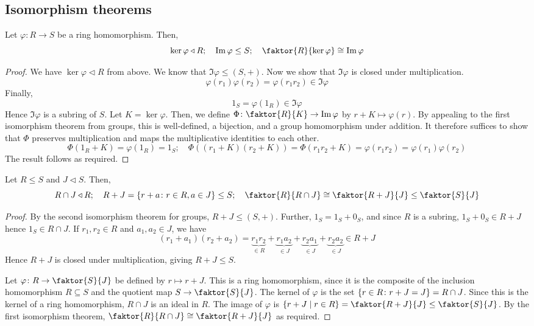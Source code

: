 \subsection{Isomorphism theorems}
\begin{theorem}
	Let \( \varphi \colon R \to S \) be a ring homomorphism.
	Then,
	\[
		\ker \varphi \triangleleft R;\quad \Im \varphi \leq S;\quad \faktor{R}{\ker \varphi} \cong \Im \varphi
	\]
\end{theorem}
\begin{proof}
	We have \( \ker \varphi \triangleleft R \) from above.
	We know that \( \Im \varphi \leq (S, +) \).
	Now we show that \( \Im \varphi \) is closed under multiplication.
	\[
		\varphi(r_1) \varphi(r_2) = \varphi(r_1 r_2) \in \Im \varphi
	\]
	Finally,
	\[
		1_S = \varphi(1_R) \in \Im \varphi
	\]
	Hence \( \Im \varphi \) is a subring of \( S \).
	Let \( K = \ker \varphi \).
	Then, we define \( \Phi \colon \faktor{R}{K} \to \Im \varphi \) by \( r+K \mapsto \varphi(r) \).
	By appealing to the first isomorphism theorem from groups, this is well-defined, a bijection, and a group homomorphism under addition.
	It therefore suffices to show that \( \Phi \) preserves multiplication and maps the multiplicative identities to each other.
	\[
		\Phi(1_R + K) = \varphi(1_R) = 1_S;\quad \Phi((r_1+K)(r_2+K)) = \Phi(r_1 r_2 +K) = \varphi(r_1 r_2) = \varphi(r_1) \varphi(r_2)
	\]
	The result follows as required.
\end{proof}
\begin{theorem}
	Let \( R \leq S \) and \( J \triangleleft S \).
	Then,
	\[
		R \cap J \triangleleft R;\quad R + J = \qty{r+a \colon r\in R, a \in J} \leq S;\quad \faktor{R}{R \cap J} \cong \faktor{R+J}{J} \leq \faktor{S}{J}
	\]
\end{theorem}
\begin{proof}
	By the second isomorphism theorem for groups, \( R+J \leq (S, +) \).
	Further, \( 1_S = 1_S + 0_S \), and since \( R \) is a subring, \( 1_S + 0_S \in R + J \) hence \( 1_S \in R \cap J \).
	If \( r_1, r_2 \in R \) and \( a_1, a_2 \in J \), we have
	\[
		(r_1 + a_1)(r_2 + a_2) = \underbrace{r_1 r_2}_{\in R} + \underbrace{r_1 a_2}_{\in J} + \underbrace{r_2 a_1}_{\in J} + \underbrace{r_2 a_2}_{\in J} \in R + J
	\]
	Hence \( R+J \) is closed under multiplication, giving \( R+J \leq S \).

	Let \( \varphi \colon R \to \faktor{S}{J} \) be defined by \( r \mapsto r + J \).
	This is a ring homomorphism, since it is the composite of the inclusion homomorphism \( R \subseteq S \) and the quotient map \( S \to \faktor{S}{J} \).
	The kernel of \( \varphi \) is the set \( \qty{r \in R \colon r+J = J} = R \cap J \).
	Since this is the kernel of a ring homomorphism, \( R \cap J \) is an ideal in \( R \).
	The image of \( \varphi \) is \( \qty{r+J \mid r \in R} = \faktor{R+J}{J} \leq \faktor{S}{J} \).
	By the first isomorphism theorem, \( \faktor{R}{R \cap J} \cong \faktor{R+J}{J} \) as required.
\end{proof}
